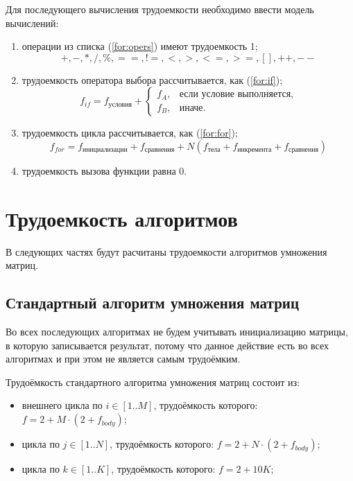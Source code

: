 Для последующего вычисления трудоемкости необходимо ввести модель вычислений:
\begin{enumerate}
	\item операции из списка (\ref{for:opers}) имеют трудоемкость 1;
	\begin{equation}
		\label{for:opers}
		+, -, *, /, \%, ==, !=, <, >, <=, >=, [], ++, {-}-
	\end{equation}
	\item трудоемкость оператора выбора  рассчитывается, как (\ref{for:if});
	\begin{equation}
		\label{for:if}
		f_{if} = f_{\text{условия}} +
		\begin{cases}
			f_A, & \text{если условие выполняется,}\\
			f_B, & \text{иначе.}
		\end{cases}
	\end{equation}
	\item трудоемкость цикла рассчитывается, как (\ref{for:for});
	\begin{equation}
		\label{for:for}
		f_{for} = f_{\text{инициализации}} + f_{\text{сравнения}} + N(f_{\text{тела}} + f_{\text{инкремента}} + f_{\text{сравнения}})
	\end{equation}
	\item трудоемкость вызова функции равна 0.
\end{enumerate}


\section{Трудоемкость алгоритмов}

В следующих частях будут расчитаны трудоемкости алгоритмов умножения матриц.

\subsection{Стандартный алгоритм умножения матриц}

Во всех последующих алгоритмах не будем учитывать инициализацию матрицы, в которую записывается результат, потому что данное действие есть во всех алгоритмах и при этом не является самым трудоёмким.

Трудоёмкость стандартного алгоритма умножения матриц состоит из:
\begin{itemize}
	\item внешнего цикла по $i \in [1..M]$, трудоёмкость которого: $f = 2 + M \cdot (2 + f_{body})$;
	\item цикла по $j \in [1..N]$, трудоёмкость которого: $f = 2 + N \cdot (2 + f_{body})$;
	\item цикла по $k \in [1..K]$, трудоёмкость которого: $f = 2 + 10K$;
\end{itemize}

